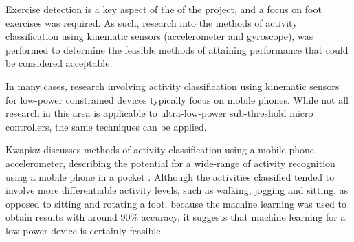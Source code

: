 
	
	Exercise detection is a key aspect of the of the project, and a focus on foot exercises was required. As such, research into the methods of activity classification using kinematic sensors (accelerometer and gyroscope), was performed to determine the feasible methods of attaining performance that could be considered acceptable.
	
	In many cases, research involving activity classification using kinematic sensors for low-power constrained devices typically focus on mobile phones. While not all research in this area is applicable to ultra-low-power sub-threshold micro controllers, the same techniques can be applied.
	
	 Kwapisz discusses methods of activity classification using a mobile phone accelerometer, describing the potential for a wide-range of activity recognition using a mobile phone in a pocket \cite{kwapisz2011activity}. Although the activities classified tended to involve more differentiable activity levels, such as walking, jogging and sitting, as opposed to sitting and rotating a foot, because the machine learning was used to obtain results with around 90\% accuracy, it suggests that machine learning for a low-power device is certainly feasible. 
	
	
